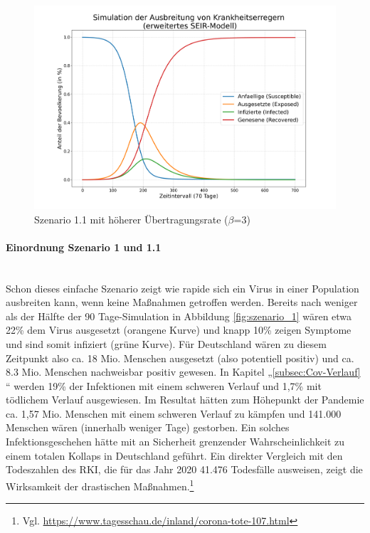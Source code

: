 \documentclass[12pt]{article}
\begin{document}
\begin{figure}[H]
\centering
\includegraphics[scale=0.35]{Szenario_1_beta30}
\caption{Szenario 1.1 mit höherer Übertragungsrate ($\beta$=3)}
\label{fig:Szenario_1_beta30}
\end{figure}

\paragraph{Einordnung Szenario 1 und 1.1}\mbox{} \\
Schon dieses einfache Szenario zeigt wie rapide sich ein Virus in einer Population ausbreiten kann, wenn keine Maßnahmen getroffen werden. Bereits nach weniger als der Hälfte der 90 Tage-Simulation in Abbildung \ref{fig:szenario_1} wären etwa 22\% dem Virus ausgesetzt (orangene Kurve) und knapp 10\% zeigen Symptome und sind somit infiziert (grüne Kurve). Für Deutschland wären zu diesem Zeitpunkt also ca. 18 Mio. Menschen ausgesetzt (also potentiell positiv) und ca. 8.3 Mio. Menschen nachweisbar positiv gewesen. In Kapitel „\ref{subsec:Cov-Verlauf} “ werden 19\% der Infektionen mit einem schweren Verlauf und 1,7\% mit tödlichem Verlauf ausgewiesen. Im Resultat hätten zum Höhepunkt der Pandemie ca. 1,57 Mio. Menschen mit einem schweren Verlauf zu kämpfen und 141.000 Menschen wären (innerhalb weniger Tage) gestorben. Ein solches Infektionsgeschehen hätte mit an Sicherheit grenzender Wahrscheinlichkeit zu einem totalen Kollaps in Deutschland geführt. Ein direkter Vergleich mit den Todeszahlen des RKI, die für das Jahr 2020 41.476 Todesfälle ausweisen, zeigt die Wirksamkeit der drastischen Maßnahmen.\footnote{Vgl. \url{https://www.tagesschau.de/inland/corona-tote-107.html}}
\end{document}
